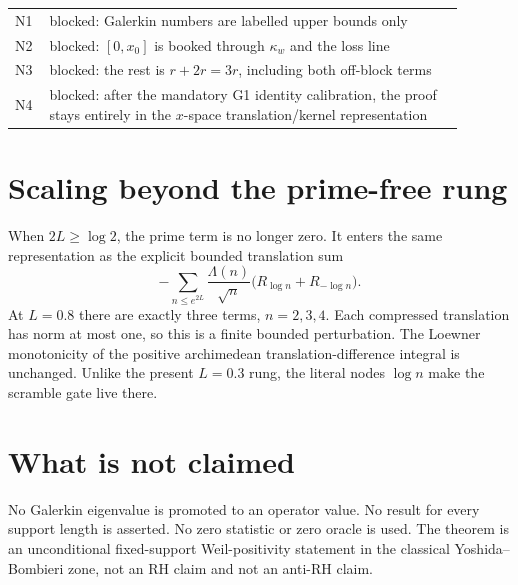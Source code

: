 \documentclass[11pt]{article}
\begin{document}
\begin{center}
\small
\begin{tabular}{@{}p{0.06\linewidth}p{0.83\linewidth}@{}}
\toprule
N1 & blocked: Galerkin numbers are labelled upper bounds only\\
N2 & blocked: $[0,x_0]$ is booked through $\kappa_w$ and the loss line\\
N3 & blocked: the rest is $r+2r=3r$, including both off-block terms\\
N4 & blocked: after the mandatory G1 identity calibration, the proof
stays entirely in the $x$-space translation/kernel representation\\
\bottomrule
\end{tabular}
\end{center}

\section{Scaling beyond the prime-free rung}

When $2L\ge\log2$, the prime term is no longer zero.  It enters the
same representation as the explicit bounded translation sum
\[
 -\sum_{n\le e^{2L}}\frac{\Lambda(n)}{\sqrt n}
   \bigl(R_{\log n}+R_{-\log n}\bigr).
\]
At $L=0.8$ there are exactly three terms, $n=2,3,4$.  Each compressed
translation has norm at most one, so this is a finite bounded
perturbation.  The Loewner monotonicity of the positive
archimedean translation-difference integral is unchanged.  Unlike
the present $L=0.3$ rung, the literal nodes $\log n$ make the
scramble gate live there.

\section{What is not claimed}

No Galerkin eigenvalue is promoted to an operator value.  No result
for every support length is asserted.  No zero statistic or zero
oracle is used.  The theorem is an unconditional fixed-support
Weil-positivity statement in the classical Yoshida--Bombieri zone,
not an RH claim and not an anti-RH claim.
\end{document}
